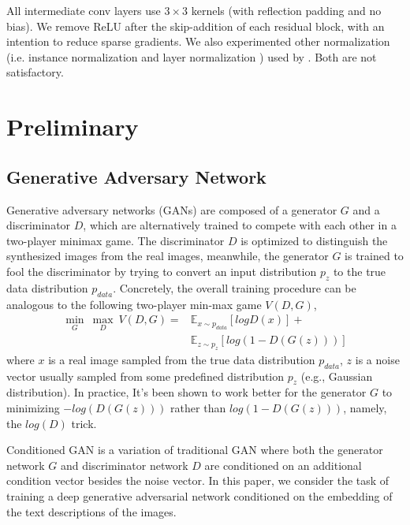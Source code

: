 \documentclass[10pt,twocolumn,letterpaper]{article}
\begin{document}
All intermediate conv layers use $3{\times}3$ kernels (with reflection padding and no bias). We remove ReLU after the skip-addition of each residual block, with an intention to reduce sparse gradients. 
We also experimented other normalization (i.e. instance normalization \cite{ulyanov2016instance} and layer normalization \cite{ba2016layer}) used by \cite{zhu2017unpaired,chen2017photographic}. Both are not satisfactory. 

\section{Preliminary}
\subsection{Generative Adversary Network}
Generative adversary networks (GANs) are composed of a generator $G$ and a discriminator $D$, which are alternatively trained to compete with each other in a two-player minimax game. The discriminator $D$ is optimized to distinguish the synthesized images from the real images, meanwhile, the generator $G$ is trained to fool the discriminator by trying to convert an input distribution $p_z$ to the true data distribution $p_{data}$. Concretely, the overall training procedure can be analogous to the following two-player min-max game $V(D, G)$,
 \begin{equation}
 \label{game}
 \begin{split}
  \underset{G}{\min}\ \underset{D}{\max}\ V(D, G) =  &\mathbb{E}_{x\sim p_{data}}[log D(x)] +  \\
					  &\mathbb{E}_{z\sim p_{z}}[log (1-D(G(z)))]		   
 \end{split}
 \end{equation}
where $x$ is a real image sampled from the true data distribution $p_{data}$, $z$ is a noise vector usually sampled from some predefined distribution $p_{z}$ (e.g., Gaussian distribution).
In practice, It's been shown to work better for the generator $G$ to minimizing $-log(D(G(z)))$ rather than $log(1-D(G(z)))$, namely, the $log(D)$ trick.

Conditioned GAN \cite{isola2016image} is a variation of traditional GAN where both the generator network $G$ and discriminator network $D$ are conditioned on an additional condition vector besides the noise vector. In this paper, we consider the task of training a deep  generative adversarial network conditioned on the embedding of the text descriptions of the images.
\end{document}

